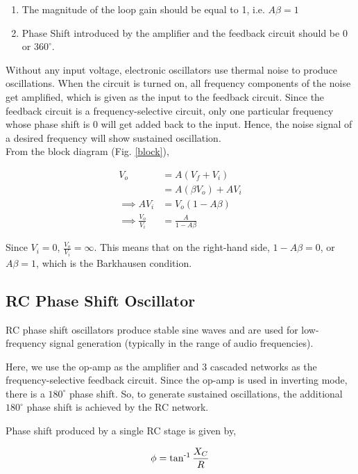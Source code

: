 \begin{enumerate}
    \item The magnitude of the loop gain should be equal to 1, i.e. $A\beta=1$
    \item Phase Shift introduced by the amplifier and the feedback circuit should be 0 or $360^{\circ}$.\\
\end{enumerate}

Without any input voltage, electronic oscillators use thermal noise to produce oscillations. When the circuit is turned on, all frequency components of the noise get amplified, which is given as the input to the feedback circuit. Since the feedback circuit is a frequency-selective circuit, only one particular frequency whose phase shift is 0 will get added back to the input. Hence, the noise signal of a desired frequency will show sustained oscillation.\\

\noindent From the block diagram (Fig. \ref{block}), 

\begin{align}
    V_o &= A(V_f + V_i) \nonumber\\
    &=A(\beta V_o) + AV_i \nonumber\\
    \implies AV_i &= V_o(1-A\beta) \nonumber\\
    \implies \frac{V_o}{V_i} &= \frac{A}{1-A\beta}
\end{align}

Since $V_i=0$, $\frac{V_o}{V_i}=\infty$. This means that on the right-hand side, $1-A\beta=0$, or $A\beta=1$, which is the Barkhausen condition. 

\subsection*{RC Phase Shift Oscillator}

RC phase shift oscillators produce stable sine waves and are used for low-frequency signal generation (typically in the range of audio frequencies).

Here, we use the op-amp as the amplifier and 3 cascaded networks as the frequency-selective feedback circuit. Since the op-amp is used in inverting mode, there is a $180^{\circ}$ phase shift. So, to generate sustained oscillations, the additional $180^{\circ}$ phase shift is achieved by the RC network.

Phase shift produced by a single RC stage is given by,

\begin{align}
    \phi = \operatorname{tan^{-1}}{\frac{X_C}{R}}
\end{align}

